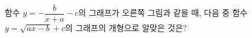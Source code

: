 \noindent\begin{minipage}[t]{0.58\linewidth}\vspace{0pt}\raggedright 함수 $y=-\dfrac{b}{x+a}-c$의 그래프가 오른쪽 그림과 같을 때, 다음 중 함수 $y=\sqrt{ax-b}+c$의 그래프의 개형으로 알맞은 것은? \end{minipage}\hfill\begin{minipage}[t]{0.4\linewidth}\vspace{0pt}\centering \resizebox{\ifdim\width>\linewidth\linewidth\else\width\fi}{!}{}\end{minipage}\par
\begin{choicesii}{}{}{}{}{}\end{choicesii}
